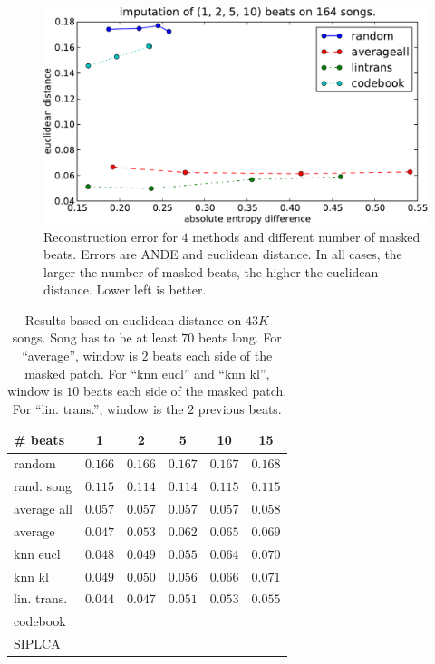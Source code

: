 \documentclass{article}
\begin{document}
\begin{figure}[t]
\begin{center}
\includegraphics[width=.9\columnwidth]{recon_score_in_2d}
\end{center}
\caption{Reconstruction error for $4$ methods and different
number of masked beats. Errors are ANDE and euclidean
distance. In all cases, the larger the number of masked beats,
the higher the euclidean distance. Lower left is better.
\label{fig:2dscore}}
\end{figure}


\iffalse
\begin{table}[t]
\begin{small}
\begin{center}
\begin{tabular}{l|c|c|c|c|c|}
\# beats  & 1 & 2 & 5 & 10 & 15 \\ \hline \hline
random & $0.166$ & $0.166$ & $0.167$ & $0.167$ & $0.168$  \\
rand. song & $0.115$ & $0.114$ & $0.114$ & $0.115$ & $0.115$  \\
average all & $0.057$ & $0.057$ & $0.057$ & $0.057$ & $0.058$ \\
average & $0.047$ & $0.053$ & $0.062$ & $0.065$ & $0.069$ \\ \hline
knn eucl & $0.048$ & $0.049$ & $0.055$ & $0.064$ &  $0.070$ \\
knn kl & $0.049$ & $0.050$ & $0.056$ & $0.066$ &  $0.071$ \\
lin. trans. & $\mathbf{0.044}$ & $\mathbf{0.047}$ & $\mathbf{0.051}$ & $\mathbf{0.053}$ & $\mathbf{0.055}$ \\
codebook & & & & &  \\
SIPLCA & & & & &  \\ \hline
\end{tabular}
\caption{Results based on euclidean distance on $43K$ songs.
Song has to be at least $70$ beats long. 
For ``average'', window is $2$ beats each side of the masked patch.
For ``knn eucl'' and ``knn kl'', window is $10$ beats each side of the masked patch.
For ``lin. trans.'', window is the $2$ previous beats.}
\label{tab:reseucl}
\end{center}
\end{small}
\end{table}
\end{document}

